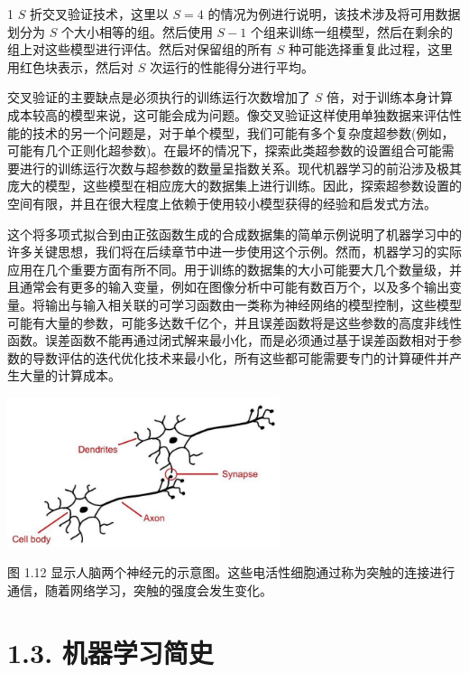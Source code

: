 \documentclass[10pt]{report}
\begin{document}
1 \(S\) 折交叉验证技术，这里以 \(S = 4\) 的情况为例进行说明，该技术涉及将可用数据划分为 \(S\) 个大小相等的组。然后使用 \(S - 1\) 个组来训练一组模型，然后在剩余的组上对这些模型进行评估。然后对保留组的所有 \(S\) 种可能选择重复此过程，这里用红色块表示，然后对 \(S\) 次运行的性能得分进行平均。

交叉验证的主要缺点是必须执行的训练运行次数增加了 \(S\) 倍，对于训练本身计算成本较高的模型来说，这可能会成为问题。像交叉验证这样使用单独数据来评估性能的技术的另一个问题是，对于单个模型，我们可能有多个复杂度超参数(例如，可能有几个正则化超参数)。在最坏的情况下，探索此类超参数的设置组合可能需要进行的训练运行次数与超参数的数量呈指数关系。现代机器学习的前沿涉及极其庞大的模型，这些模型在相应庞大的数据集上进行训练。因此，探索超参数设置的空间有限，并且在很大程度上依赖于使用较小模型获得的经验和启发式方法。

这个将多项式拟合到由正弦函数生成的合成数据集的简单示例说明了机器学习中的许多关键思想，我们将在后续章节中进一步使用这个示例。然而，机器学习的实际应用在几个重要方面有所不同。用于训练的数据集的大小可能要大几个数量级，并且通常会有更多的输入变量，例如在图像分析中可能有数百万个，以及多个输出变量。将输出与输入相关联的可学习函数由一类称为神经网络的模型控制，这些模型可能有大量的参数，可能多达数千亿个，并且误差函数将是这些参数的高度非线性函数。误差函数不能再通过闭式解来最小化，而是必须通过基于误差函数相对于参数的导数评估的迭代优化技术来最小化，所有这些都可能需要专门的计算硬件并产生大量的计算成本。

\begin{center}
\includegraphics[max width=0.6\textwidth]{images/0194e279-9b28-703a-88f4-c3ac21e2010d_35_755_356_776_426_0.jpg}
\end{center}
\hspace*{3em} 

图 1.12 显示人脑两个神经元的示意图。这些电活性细胞通过称为突触的连接进行通信，随着网络学习，突触的强度会发生变化。

\section*{1.3. 机器学习简史}
\end{document}
